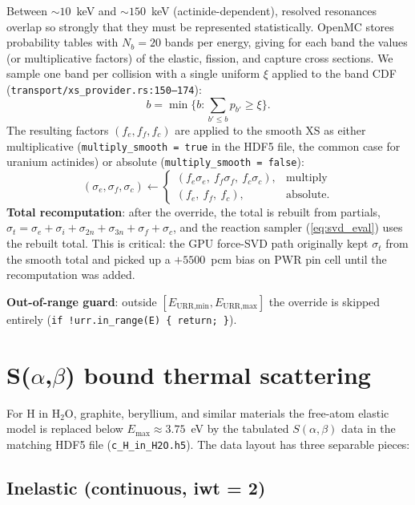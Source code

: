 \documentclass[11pt,a4paper]{article}
\begin{document}
Between $\sim\!10$~keV and $\sim\!150$~keV (actinide-dependent),
resolved resonances overlap so strongly that they must be
represented statistically. OpenMC stores probability tables
with $N_b = 20$ bands per energy, giving for each band the
values (or multiplicative factors) of the elastic, fission, and
capture cross sections. We sample one band per collision with a
single uniform $\xi$ applied to the band CDF
(\texttt{transport/xs\_provider.rs:150--174}):
\begin{equation}
b = \min\{b : \sum_{b' \leq b} p_{b'} \geq \xi\}.
\end{equation}
The resulting factors $(f_e, f_f, f_c)$ are applied to the smooth
XS as either multiplicative (\texttt{multiply\_smooth = true} in
the HDF5 file, the common case for uranium actinides) or
absolute (\texttt{multiply\_smooth = false}):
\begin{equation}
(\sigma_e, \sigma_f, \sigma_c) \leftarrow
\begin{cases}
(f_e \sigma_e,\ f_f \sigma_f,\ f_c \sigma_c), & \text{multiply} \\
(f_e,\ f_f,\ f_c), & \text{absolute}.
\end{cases}
\end{equation}
\textbf{Total recomputation}: after the override, the total is
rebuilt from partials,
$\sigma_t = \sigma_e + \sigma_i + \sigma_{2n} + \sigma_{3n}
+ \sigma_f + \sigma_c$, and the reaction sampler
(\eqref{eq:svd_eval}) uses the rebuilt total. This is critical:
the GPU force-SVD path originally kept $\sigma_t$ from the
smooth total and picked up a $+5500$~pcm bias on PWR pin cell
until the recomputation was added.

\textbf{Out-of-range guard}: outside $[E_\text{URR,min},
E_\text{URR,max}]$ the override is skipped entirely
(\texttt{if !urr.in\_range(E) \{ return; \}}).

\section{S($\alpha$,$\beta$) bound thermal scattering}
\label{sec:sab}

For H in H$_2$O, graphite, beryllium, and similar materials the
free-atom elastic model is replaced below $E_\text{max} \approx
3.75$~eV by the tabulated $S(\alpha, \beta)$ data in the
matching HDF5 file (\texttt{c\_H\_in\_H2O.h5}). The data layout
has three separable pieces:

\subsection{Inelastic (continuous, iwt = 2)}
\end{document}
